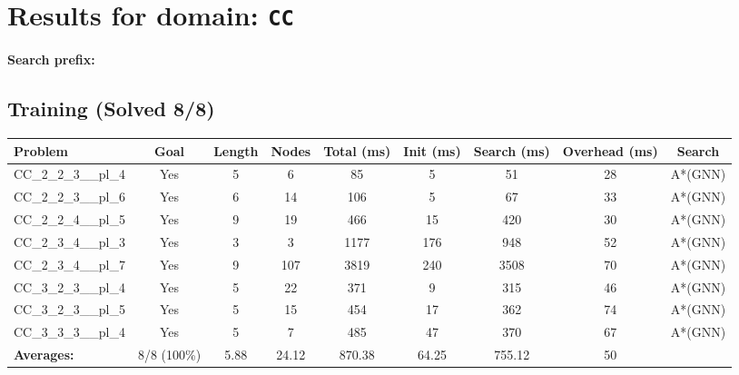 \documentclass{article}
\begin{document}
\section*{Results for domain: \texttt{CC}}
\textbf{Search prefix:} 
\\[0.5cm]
\subsection*{Training (Solved 8/8)}
\begin{tabular}{lcccccccc}
\toprule
Problem & Goal & Length & Nodes & Total (ms) & Init (ms) & Search (ms) & Overhead (ms) & Search \\
\midrule
CC\_2\_2\_3\_\_pl\_4 & Yes & 5 & 6 & 85 & 5 & 51 & 28 & A*(GNN) \\
CC\_2\_2\_3\_\_pl\_6 & Yes & 6 & 14 & 106 & 5 & 67 & 33 & A*(GNN) \\
CC\_2\_2\_4\_\_pl\_5 & Yes & 9 & 19 & 466 & 15 & 420 & 30 & A*(GNN) \\
CC\_2\_3\_4\_\_pl\_3 & Yes & 3 & 3 & 1177 & 176 & 948 & 52 & A*(GNN) \\
CC\_2\_3\_4\_\_pl\_7 & Yes & 9 & 107 & 3819 & 240 & 3508 & 70 & A*(GNN) \\
CC\_3\_2\_3\_\_pl\_4 & Yes & 5 & 22 & 371 & 9 & 315 & 46 & A*(GNN) \\
CC\_3\_2\_3\_\_pl\_5 & Yes & 5 & 15 & 454 & 17 & 362 & 74 & A*(GNN) \\
CC\_3\_3\_3\_\_pl\_4 & Yes & 5 & 7 & 485 & 47 & 370 & 67 & A*(GNN) \\
\textbf{Averages:} & 8/8 (100\%) & 5.88 & 24.12 & 870.38 & 64.25 & 755.12 & 50 & \\
\bottomrule
\end{tabular}
\\[0.7cm]
\end{document}
